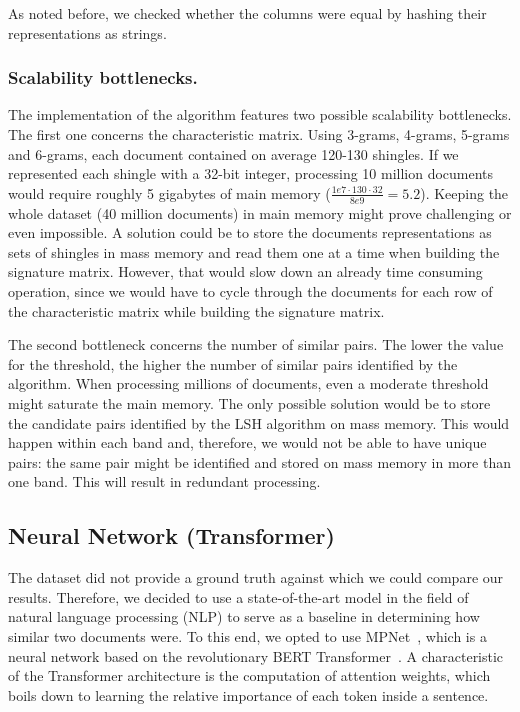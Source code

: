 \documentclass[runningheads]{llncs}
\begin{document}
As noted before, we checked whether the columns were equal by hashing their representations as strings.

\subsubsection{Scalability bottlenecks.} The implementation of the algorithm features two possible scalability bottlenecks. The first one concerns the characteristic matrix. Using 3-grams, 4-grams, 5-grams and 6-grams, each document contained on average 120-130 shingles. If we represented each shingle with a 32-bit integer, processing 10 million documents would require roughly 5 gigabytes of main memory ($\frac{1e7 \cdot 130 \cdot 32}{8e9} = 5.2$). Keeping the whole dataset (40 million documents) in main memory might prove challenging or even impossible. A solution could be to store the documents representations as sets of shingles in mass memory and read them one at a time when building the signature matrix. However, that would slow down an already time consuming operation, since we would have to cycle through the documents for each row of the characteristic matrix while building the signature matrix.

The second bottleneck concerns the number of similar pairs. The lower the value for the threshold, the higher the number of similar pairs identified by the algorithm. When processing millions of documents, even a moderate threshold might saturate the main memory. The only possible solution would be to store the candidate pairs identified by the LSH algorithm on mass memory. This would happen within each band and, therefore, we would not be able to have unique pairs: the same pair might be identified and stored on mass memory in more than one band. This will result in redundant processing. 

\subsection{Neural Network (Transformer)}
\label{subsec:models:transformer}

The dataset did not provide a ground truth against which we could compare our results. Therefore, we decided to use a state-of-the-art model in the field of natural language processing (NLP) to serve as a baseline in determining how similar two documents were. To this end, we opted to use MPNet~\cite{song_2020}, which is a neural network based on the revolutionary BERT Transformer~\cite{vaswani_2017, devlin-etal-2019-bert}. A characteristic of the Transformer architecture is the computation of attention weights, which boils down to learning the relative importance of each token inside a sentence. 
\end{document}
